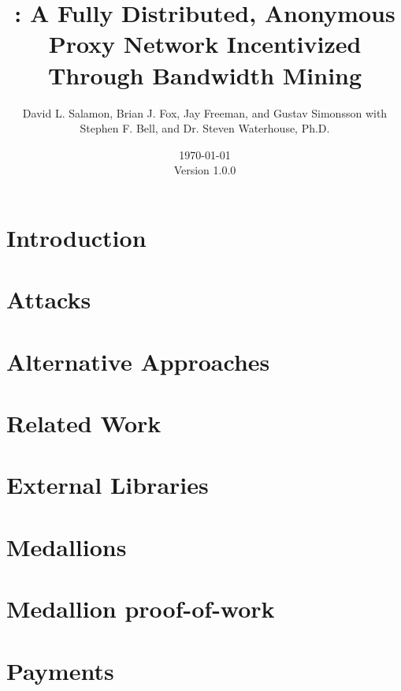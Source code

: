 \documentclass{article}
\title{\Orchid: A Fully Distributed, Anonymous Proxy Network Incentivized Through Bandwidth Mining}
\author{{David L. Salamon, Brian J. Fox, Jay Freeman, and Gustav Simonsson with} \\ {{Stephen F. Bell, and Dr. Steven Waterhouse, Ph.D.}}}
\date{\today{} \\ Version 1.0.0}
\begin{document}
\maketitle

\begin{abstract}

\end{abstract}

\newpage
\tableofcontents
\newpage

\section{Introduction}
\label{sec:overview}


\section{Attacks}
\label{sec:attacks}


\section{Alternative Approaches}
\label{sec:prior-work}


\section{Related Work}
\label{sec:related}


\section{External Libraries}
\label{sec:external-libraries}


\section{Medallions}
\label{medallions}


\section{Medallion proof-of-work}
\label{medallionspow}


\section{Payments}
\label{sec:payments}

\end{document}
